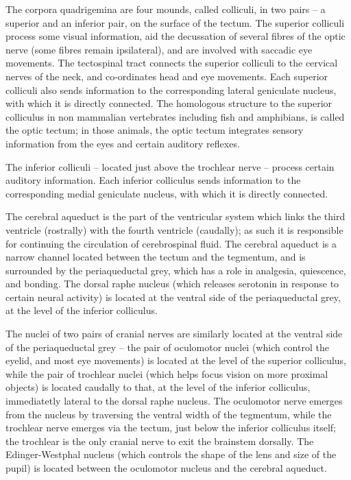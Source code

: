 The corpora quadrigemina are four mounds, called colliculi, in two pairs -- a superior and an inferior pair, on the surface of the tectum. The superior colliculi process some visual information, aid the decussation of several fibres of the optic nerve (some fibres remain ipsilateral), and are involved with saccadic eye movements. The tectospinal tract connects the superior colliculi to the cervical nerves of the neck, and co-ordinates head and eye movements. Each superior colliculi also sends information to the corresponding lateral geniculate nucleus, with which it is directly connected. The homologous structure to the superior colliculus in non mammalian vertebrates including fish and amphibians, is called the optic tectum; in those animals, the optic tectum integrates sensory information from the eyes and certain auditory reflexes.

The inferior colliculi -- located just above the trochlear nerve -- process certain auditory information. Each inferior colliculus sends information to the corresponding medial geniculate nucleus, with which it is directly connected.

The cerebral aqueduct is the part of the ventricular system which links the third ventricle (rostrally) with the fourth ventricle (caudally); as such it is responsible for continuing the circulation of cerebrospinal fluid. The cerebral aqueduct is a narrow channel located between the tectum and the tegmentum, and is surrounded by the periaqueductal grey, which has a role in analgesia, quiescence, and bonding. The dorsal raphe nucleus (which releases serotonin in response to certain neural activity) is located at the ventral side of the periaqueductal grey, at the level of the inferior colliculus.

The nuclei of two pairs of cranial nerves are similarly located at the ventral side of the periaqueductal grey -- the pair of oculomotor nuclei (which control the eyelid, and most eye movements) is located at the level of the superior colliculus, while the pair of trochlear nuclei (which helps focus vision on more proximal objects) is located caudally to that, at the level of the inferior colliculus, immediatetly lateral to the dorsal raphe nucleus. The oculomotor nerve emerges from the nucleus by traversing the ventral width of the tegmentum, while the trochlear nerve emerges via the tectum, just below the inferior colliculus itself; the trochlear is the only cranial nerve to exit the brainstem dorsally. The Edinger-Westphal nucleus (which controls the shape of the lens and size of the pupil) is located between the oculomotor nucleus and the cerebral aqueduct.

